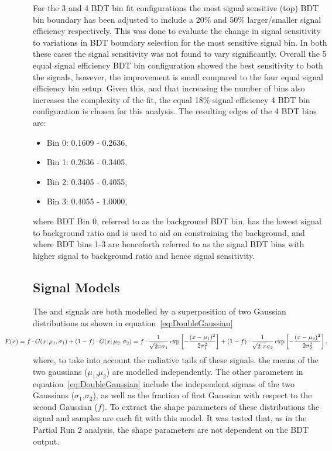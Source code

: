 For the 3 and 4 BDT bin fit configurations the most signal sensitive (top) BDT bin boundary has been adjusted to include a 20\% and 50\% larger/smaller signal efficiency respectively. This was done to evaluate the change in signal sensitivity to variations in BDT boundary selection for the most sensitive signal bin. In both these cases the signal sensitivity was not found to vary significantly. Overall the 5 equal signal efficiency BDT bin configuration showed the best sensitivity to both the signals, however, the improvement is small compared to the four equal signal efficiency bin setup. 
Given this, and that increasing the number of bins also increases the complexity of the fit, the equal 18\% signal efficiency 4 BDT bin configuration is chosen for this analysis. 
The resulting edges of the 4 BDT bins are: 
\begin{itemize} 
\item Bin 0: 0.1609 - 0.2636,
\item Bin 1: 0.2636 - 0.3405,
\item Bin 2: 0.3405 - 0.4055,
\item Bin 3: 0.4055 - 1.0000,
\end{itemize}
where BDT Bin 0, referred to as the background BDT bin, has the lowest signal to background ratio and is used to aid on constraining the background, and where BDT bins 1-3 are henceforth referred to as the signal BDT bins with higher signal to background ratio and hence signal sensitivity.



\subsection{Signal Models}
\label{subsec:SignalModels}

The \Bsmumu and \Bdmumu signals are both modelled by a superposition of two Gaussian distributions as shown in equation~\ref{eq:DoubleGaussian}
\begin{eqnarray}
  \hbox{\hspace{-16mm}}F(x) = f \cdot G(x; \mu_1, \sigma_1) + (1 - f) \cdot G(x; \mu_2, \sigma_2) =
  \hbox{\hspace{-0mm}}f \cdot \frac{1}{\sqrt{2\pi}\sigma_1} \exp\left[-\frac{(x-\mu_1)^2}{2\sigma_1^2}\right] + (1-f) \cdot \frac{1}{\sqrt{2\
      \pi}\sigma_2} \exp\left[-\frac{(x-\mu_2)^2}{2\sigma_2^2}\right],
  \label{eq:DoubleGaussian} 
\end{eqnarray}
where, to take into account the radiative tails of these signals, the means of the two gaussians ($\mu_1$,$\mu_2$) are modelled independently. The other parameters in equation~\ref{eq:DoubleGaussian} include the independent sigmas of the two Gaussians ($\sigma_1$,$\sigma_2$), as well as the fraction of first Gaussian with respect to the second Gaussian ($f$). To extract the shape parameters of these distributions the signal \Bsmumu and \Bdmumu samples are each fit with this model. 
It was tested that, as in the Partial Run 2 analysis, the shape parameters are not dependent on the BDT output.

